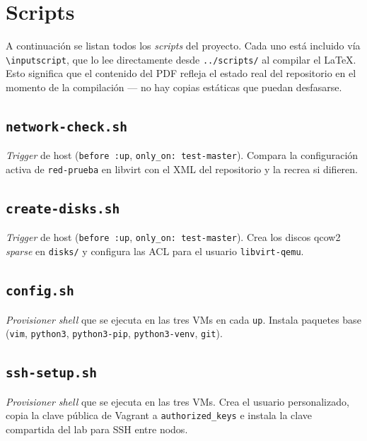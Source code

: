 \section{Scripts}

A continuación se listan todos los \emph{scripts} del proyecto. Cada uno está incluido vía \texttt{\textbackslash inputscript}, que lo lee directamente desde \texttt{../scripts/} al compilar el LaTeX. Esto significa que el contenido del PDF refleja el estado real del repositorio en el momento de la compilación --- no hay copias estáticas que puedan desfasarse.

\subsection{\texttt{network-check.sh}}

\emph{Trigger} de host (\texttt{before :up}, \texttt{only\_on: test-master}). Compara la configuración activa de \texttt{red-prueba} en libvirt con el XML del repositorio y la recrea si difieren.


\subsection{\texttt{create-disks.sh}}

\emph{Trigger} de host (\texttt{before :up}, \texttt{only\_on: test-master}). Crea los discos qcow2 \emph{sparse} en \texttt{disks/} y configura las ACL para el usuario \texttt{libvirt-qemu}.


\subsection{\texttt{config.sh}}

\emph{Provisioner} \emph{shell} que se ejecuta en las tres VMs en cada \texttt{up}. Instala paquetes base (\texttt{vim}, \texttt{python3}, \texttt{python3-pip}, \texttt{python3-venv}, \texttt{git}).


\subsection{\texttt{ssh-setup.sh}}

\emph{Provisioner} \emph{shell} que se ejecuta en las tres VMs. Crea el usuario personalizado, copia la clave pública de Vagrant a \texttt{authorized\_keys} e instala la clave compartida del lab para SSH entre nodos.


